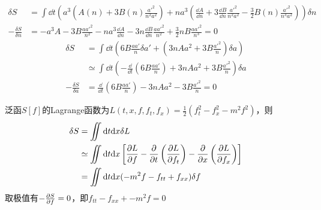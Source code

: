 \begin{solution}
    \[
        \begin{aligned}
            \delta S & = \int \dd t \left(a^3\left(A(n) + 3B(n) \frac{a'^2}{n^2 a^2}\right) + n a^3 \left(\frac{\dd A}{\dd n} + 3\frac{\dd B}{\dd n}\frac{a'^2}{n^2 a^2} - \frac{3}{2}B(n)\frac{a'^2}{n^3 a^2}\right)\right) \delta n\\
            -\frac{\delta S}{\delta n} & = -a^3 A - 3B \frac{a a'^2}{n^2} - n a^3 \frac{\dd A}{\dd n} - 3n \frac{\dd B}{\dd n} \frac{a a'^2}{n^2} + \frac{3}{2}nB\frac{a a'^2}{n^3} = 0
        \end{aligned}
    \]
    \[
        \begin{aligned}
            \delta S & = \int \dd t \left(6 B \frac{a a'}{n} \delta a' + \left(3 n A a^2 + 3 B \frac{a'^2}{n}\right)\delta a\right) \\
            & \simeq \int \dd t \left(- \frac{\dd}{\dd t}\left(6 B \frac{a a'}{n}\right) + 3 n A a^2 + 3 B \frac{a'^2}{n}\right) \delta a \\
            - \frac{\delta S}{\delta a} & = \frac{\dd}{\dd t}\left(6 B \frac{a a'}{n}\right) - 3 n A a^2 - 3 B \frac{a'^2}{n} = 0
        \end{aligned}
    \]
\end{solution}

\begin{solution}
    泛函\(S[f]\)的Lagrange函数为\(L(t,x,f,f_t,f_x) = \frac12(f_t^2-f_x^2-m^2f^2)\)，则
    \[
    \begin{aligned}
        \delta S & = \iint \dd t \dd x \delta L \\
                 & \simeq \iint \dd t \dd x \left[
                    \frac{\partial L}{\partial f} - \frac{\partial}{\partial t}\left( \frac{\partial L}{\partial f_t} \right) - \frac{\partial}{\partial x}\left( \frac{\partial L}{\partial f_x} \right)
                    \right] \\
                 & = \iint \dd t \dd x  
                 (-m^2f - f_{tt} + f_{xx})
                 \delta f
    \end{aligned}
    \]
    取极值有\(-\frac{\partial S}{\partial f}=0\)，即\(f_{tt} - f_{xx} + -m^2f = 0\)
\end{solution}

